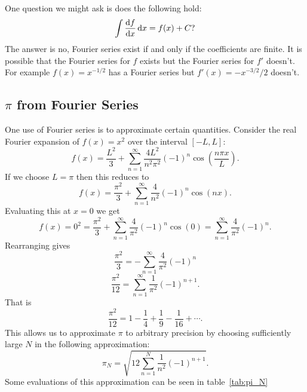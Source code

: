 \documentclass[a4paper]{article}
\begin{document}
    One question we might ask is does the following hold:
    \[\int \dv{f}{x}\dd{x} = f(x) + C?\]
    The answer is no, Fourier series exist if and only if the coefficients are finite.
    It is possible that the Fourier series for \(f\) exists but the Fourier series for \(f'\) doesn't.
    For example \(f(x) = x^{-1/2}\) has a Fourier series but \(f'(x) = -x^{-3/2}/2\) doesn't.
    
    \subsection{\texorpdfstring{\(\pi\)}{pi} from Fourier Series}
    One use of Fourier series is to approximate certain quantities.
    Consider the real Fourier expansion of \(f(x) = x^2\) over the interval \([-L, L]\):
    \[f(x) = \frac{L^2}{3} + \sum_{n=1}^{\infty} \frac{4L^2}{n^2\pi^2}(-1)^n\cos\left(\frac{n\pi x}{L}\right).\]
    If we choose \(L = \pi\) then this reduces to
    \[f(x) = \frac{\pi^2}{3} + \sum_{n=1}^{\infty}\frac{4}{n^2}(-1)^n\cos(nx).\]
    Evaluating this at \(x = 0\) we get
    \[f(x) = 0^2 = \frac{\pi^2}{3} + \sum_{n=1}^{\infty}\frac{4}{\pi^2}(-1)^n\cos(0) = \sum_{n=1}^{\infty}\frac{4}{\pi^2}(-1)^n.\]
    Rearranging gives
    \[\frac{\pi^2}{3} = -\sum_{n=1}^{\infty}\frac{4}{\pi^2}(-1)^n\]
    \[\frac{\pi^2}{12} = \sum_{n=1}^{\infty}\frac{1}{\pi^2}(-1)^{n+1}.\]
    That is
    \[\frac{\pi^2}{12} = 1 - \frac{1}{4} + \frac{1}{9} - \frac{1}{16} + \dotsb.\]
    This allows us to approximate \(\pi\) to arbitrary precision by choosing sufficiently large \(N\) in the following approximation:
    \[\pi_N = \sqrt{12\sum_{n=1}^{N}\frac{1}{n^2}(-1)^{n+1}}.\]
    Some evaluations of this approximation can be seen in table~\ref{tab:pi_N}
\end{document}
